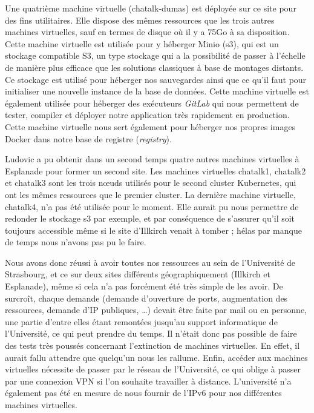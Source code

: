 Une quatrième machine virtuelle (chatalk-dumas) est déployée sur ce site
pour des fins utilitaires. Elle dispose des mêmes ressources que les
trois autres machines virtuelles, sauf en termes de disque où il y a
75Go à sa disposition. Cette machine virtuelle est utilisée pour y
héberger Minio (s3), qui est un stockage compatible S3, un type stockage
qui a la possibilité de passer à l'échelle de manière plus efficace que
les solutions classiques à base de montages distants. Ce stockage est
utilisé pour héberger nos sauvegardes ainsi que ce qu'il faut pour
initialiser une nouvelle instance de la base de données. Cette machine
virtuelle est également utilisée pour héberger des exécuteurs
\textit{GitLab} qui nous permettent de tester, compiler et déployer notre
application très rapidement en production. Cette machine virtuelle nous
sert également pour héberger nos propres images Docker dans notre base
de registre (\textit{registry}).

Ludovic a pu obtenir dans un second temps quatre autres machines
virtuelles à Esplanade pour former un second site. Les machines
virtuelles chatalk1, chatalk2 et chatalk3 sont les trois nœuds utilisés
pour le second cluster Kubernetes, qui ont les mêmes ressources que le
premier cluster. La dernière machine virtuelle, chatalk4, n'a pas été
utilisée pour le moment. Elle aurait pu nous permettre de redonder le
stockage s3 par exemple, et par conséquence de s'assurer qu'il soit
toujours accessible même si le site d'Illkirch venait à tomber ; hélas
par manque de temps nous n'avons pas pu le faire.

Nous avons donc réussi à avoir toutes nos ressources au sein de
l'Université de Strasbourg, et ce sur deux sites différents
géographiquement (Illkirch et Esplanade), même si cela n'a pas forcément
été très simple de les avoir. De surcroît, chaque demande (demande
d'ouverture de ports, augmentation des ressources, demande d'IP
publiques, \ldots) devait être faite par mail ou en personne, une partie
d'entre elles étant remontées jusqu'au support informatique de
l'Université, ce qui peut prendre du temps. Il n'était donc pas possible
de faire des tests très poussés concernant l'extinction de machines
virtuelles. En effet, il aurait fallu attendre que quelqu'un nous les
rallume. Enfin, accéder aux machines virtuelles nécessite de passer par
le réseau de l'Université, ce qui oblige à passer par une connexion VPN
si l'on souhaite travailler à distance. L'université n'a également pas
été en mesure de nous fournir de l'IPv6 pour nos différentes machines
virtuelles.

